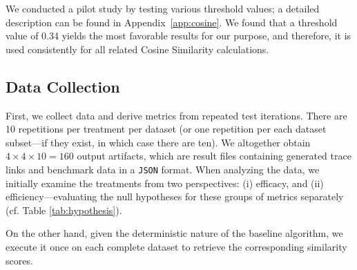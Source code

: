 \documentclass[conference]{IEEEtran}
\begin{document}
We conducted a pilot study by testing various threshold values; a detailed description can be found in Appendix~\ref{app:cosine}. We found that a threshold value of 0.34 yields the most favorable results for our purpose, and therefore, it is used consistently for all related Cosine Similarity calculations.

\subsection{Data Collection}\label{sec:data-collection}

First, we collect data and derive metrics from repeated test iterations. There are 10 repetitions per treatment per dataset (or one repetition per each dataset subset---if they exist, in which case there are ten). We altogether obtain $4 \times 4 \times 10 = 160$ output artifacts, which are result files containing generated trace links and benchmark data in a \verb|JSON| format. When analyzing the data, we initially examine the treatments from two perspectives: (i) efficacy, and (ii) efficiency---evaluating the null hypotheses for these groups of metrics separately (cf. Table \ref{tab:hypothesis}).

On the other hand, given the deterministic nature of the baseline algorithm, we execute it once on each complete dataset to retrieve the corresponding similarity scores.

\end{document}

